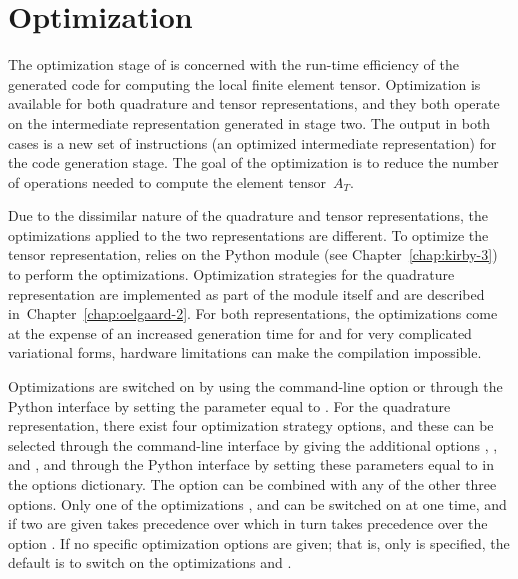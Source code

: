 \section{Optimization}

The optimization stage of \ffc{} is concerned with the run-time
efficiency of the generated code for computing the local finite
element tensor. Optimization is available for both quadrature and
tensor representations, and they both operate on the intermediate
representation generated in stage two. The output in both cases is a
new set of instructions (an optimized intermediate representation) for
the code generation stage. The goal of the optimization is to reduce
the number of operations needed to compute the element tensor~$A_T$.

Due to the dissimilar nature of the quadrature and tensor representations,
the optimizations applied to the two representations are different.
To optimize the tensor representation, \ffc{} relies on the Python
module \ferari{} (see Chapter~\ref{chap:kirby-3}) to perform the
optimizations. Optimization strategies for the quadrature representation
are implemented as part of the \ffc{} module itself and are described
in~Chapter~\ref{chap:oelgaard-2}.  For both representations, the
optimizations come at the expense of an increased generation time for
\ffc{} and for very complicated variational forms, hardware limitations
can make the compilation impossible.

Optimizations are switched on by using the command-line
option  or through the Python interface by setting the
parameter  equal to . For the quadrature
representation, there exist four optimization strategy options,
and these can be selected through the command-line interface by giving
the additional options , ,
 and ,
and through the Python interface by setting these
parameters equal to  in the options dictionary.
The option  can be combined with
any of the other three options.
Only one of the optimizations ,
 and  can be
switched on at one time, and if two are given 
takes precedence over  which in turn takes
precedence over the option .
If no specific optimization options are given; that is,
only  is specified, the default is to switch on the
optimizations  and
.

